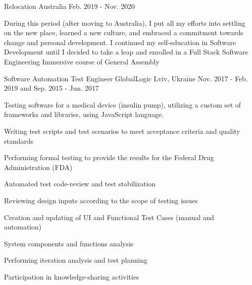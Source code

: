 \begin{cventries}
 \cventry
    {} %
    {Relocation} %
    {Australia} %
    {Feb. 2019 - Nov. 2020} %
    {
    {\singlespacing 
    \begin{cvparagraph}During this period (after moving to Australia), I put all my efforts into settling on the new place, learned a new culture, and embraced a commitment towards change and personal development. I continued my self-education in Software Development until I decided to take a leap and enrolled in a Full Stack Software Engineering Immersive course of General Assembly
    \end{cvparagraph}
    }
    \begin{cvparagraph}
    \end{cvparagraph}
    }



  \cventry
    {Software Automation Test Engineer} %
    {GlobalLogic} %
    {Lviv, Ukraine} %
    {Nov. 2017 - Feb. 2019 and Sep. 2015 - Jun. 2017} %
    {
      \begin{cvitems} %
    \item{
    Testing software for a medical device (insulin pump), utilizing a custom set of frameworks and libraries, using JavaScript language.
    }
        \item {Writing test scripts and test scenarios to meet acceptance criteria and quality standards}
        \item {Performing formal testing to provide the results for the Federal Drug Administration (FDA)}
        \item {Automated test code-review and test stabilization}
        \item {Reviewing design inputs according to the scope of testing issues}
        \item {Creation and updating of UI and Functional Test Cases (manual and automation)}
        \item {System components and functions analysis}
        \item {Performing iteration analysis and test planning}
        \item {Participation in knowledge-sharing activities}
      \end{cvitems}
    }


\end{cventries}
